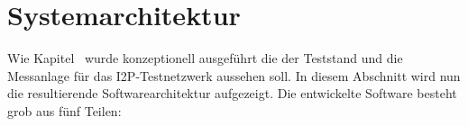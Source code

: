%
%
%
%
%

\section{Systemarchitektur}\label{sec:systemarchitektur}

Wie Kapitel~ wurde konzeptionell ausgeführt die der Teststand und die Messanlage für das I2P-Testnetzwerk aussehen soll.
In diesem Abschnitt wird nun die resultierende Softwarearchitektur aufgezeigt.
Die entwickelte Software besteht grob aus fünf Teilen:

